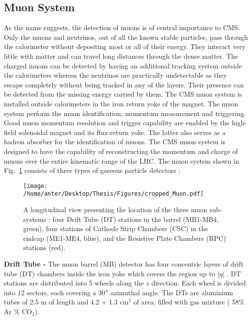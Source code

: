 \subsection{Muon System}
As the name suggests, the detection of muons is of central importance to CMS. Only the muons and neutrinos, out of all the known stable particles, pass through the calorimeter without depositing most or all of their energy. They interact very little with matter and can travel long distances through the dense matter. The charged muons can be detected by having an additional tracking system outside the calorimeters whereas the neutrinos are practically undetectable as they escape completely without being tracked in any of the layers. Their presence can be detected from the missing energy carried by them. The CMS muon system is installed outside calorimeters in the iron return yoke of the magnet. The muon system perform the muon identification, momentum measurement and triggering. Good muon momentum resolution and trigger capability are enabled by the high-field solenoidal magnet and its flux-return yoke. The latter also serves as a hadron absorber for the identification of muons. The CMS muon system is designed to have the capability of reconstructing the momentum and charge of muons over the entire kinematic range of the LHC. The muon system shown in Fig.~\ref{fig:muon} consists of three types of gaseous particle detectors : \\ \newline
\begin{figure}[!h]
\begin{center}
\vspace*{3mm} 
\hspace*{-5mm}
\texttt{[image: /home/anter/Desktop/Thesis/Figures/cropped\_Muon.pdf]}\\
\vspace*{4mm}
\caption[A longitudinal view presenting the location of the three muon sub-systems.]{A longitudinal view presenting the location of the three muon sub-systems : four Drift Tube (DT) stations in the barrel (MB1-MB4, green), four stations of Cathode Strip Chambers (CSC) in the endcap (ME1-ME4, blue), and the Resistive Plate Chambers (RPC) stations (red)\footnotemark.}
\label{fig:muon}
\end{center}
\end{figure}
{\bf Drift Tube -} 
The muon barrel (MB) detector has four concentric layers of drift tube (DT) chambers inside the iron yoke which covers the region up to $|\eta|$ . DT stations are distributed into 5 wheels along the $z$ direction. Each wheel is divided into 12 sectors, each covering a 30$\degree$ azimuthal angle. The DTs are aluminium tubes of 2.5 m of length and 4.2 $\times$ 1.3 cm$^{2}$ of area, filled with gas mixture ( 58\% Ar  \% CO$_{2}$). \\ \newline {}
